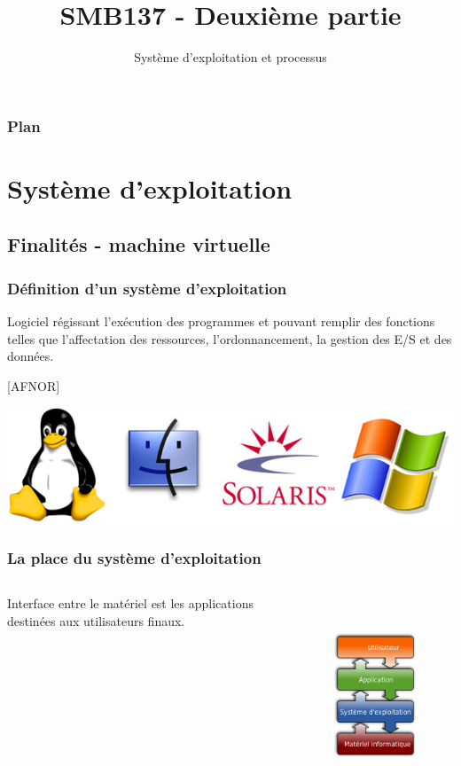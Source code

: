 

\title{SMB137 - Deuxième partie}
\subtitle{Système d'exploitation et processus}



\frame[plain]{\titlepage}

\begin{frame}
 \frametitle{Plan} 
 \tableofcontents
\end{frame} 


\section{Système d’exploitation}

\subsection{Finalités - machine virtuelle}
\begin{frame}
\frametitle{Définition d'un système d'exploitation}
\begin{definition}
Logiciel régissant l’exécution des programmes et pouvant remplir des
fonctions telles que l’affectation des ressources, l’ordonnancement,
la gestion des E/S et des données.

[AFNOR]
\end{definition}
\begin{center}
\includegraphics[heigth=2cm]{../illustration/Exemples_OS.png}
\end{center}
\end{frame}


\begin{frame}
\frametitle{La place du système d'exploitation}
\begin{columns}
Interface entre le matériel est les applications destinées aux utilisateurs finaux. \cite{wp-os}
\begin{figure}
\includegraphics[height=6cm]{../illustration/OS_placement.png}
\end{figure}
\end{columns}
\end{frame}




